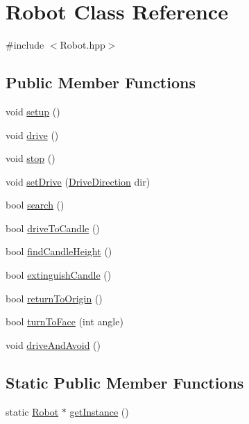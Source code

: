 \hypertarget{classRobot}{\section{Robot Class Reference}
\label{classRobot}
}


{\ttfamily \#include $<$Robot.\-hpp$>$}

\subsection*{Public Member Functions}
\begin{DoxyCompactItemize}
\item 
void \hyperlink{classRobot_a1fc37e3c329d59795f6adf44199d4df9}{setup} ()
\item 
void \hyperlink{classRobot_a8ad37bfa9e1efeaf7b5eb67667513dbe}{drive} ()
\item 
void \hyperlink{classRobot_a14dfe126ae973d3b9f81fee81a06ac22}{stop} ()
\item 
void \hyperlink{classRobot_ade0935cead03791f27fa854df88a3f22}{set\-Drive} (\hyperlink{DriveMotor_8hpp_a077d9d13989efa3142086ea83cbb1e68}{Drive\-Direction} dir)
\item 
bool \hyperlink{classRobot_a1f08dec6eea6b51d73cd41a8db3bb893}{search} ()
\item 
bool \hyperlink{classRobot_a6b943dfc58f8e1d49ee063250a2621de}{drive\-To\-Candle} ()
\item 
bool \hyperlink{classRobot_a17e0de9c529197b3575e11a87470376b}{find\-Candle\-Height} ()
\item 
bool \hyperlink{classRobot_a0dfb8f97d6a9448bc6f9ccc5b9efb9fb}{extinguish\-Candle} ()
\item 
bool \hyperlink{classRobot_ac1faa7fbfb483c4053dc35f368359c0b}{return\-To\-Origin} ()
\item 
bool \hyperlink{classRobot_afa750c4ecf35e5f26992779ac89eb13e}{turn\-To\-Face} (int angle)
\item 
void \hyperlink{classRobot_ae7a44c77eacc2a9a3d41f7a18cfb401f}{drive\-And\-Avoid} ()
\end{DoxyCompactItemize}
\subsection*{Static Public Member Functions}
\begin{DoxyCompactItemize}
\item 
static \hyperlink{classRobot}{Robot} $\ast$ \hyperlink{classRobot_ac6f19dc31b435f8a2d43944ba49286d0}{get\-Instance} ()
\end{DoxyCompactItemize}
